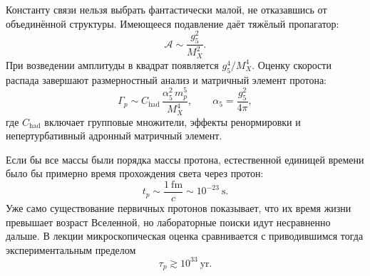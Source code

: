 \begin{classroomqa}
\end{classroomqa}

Константу связи нельзя выбрать фантастически малой, не отказавшись от объединённой структуры. Имеющееся подавление даёт тяжёлый пропагатор:
\begin{equation}
\mathcal A
\sim
\frac{g_5^2}{M_X^2}.
\label{eq:l10-amplitude}
\end{equation}
При возведении амплитуды в квадрат появляется \(g_5^4/M_X^4\). Оценку скорости распада завершают размерностный анализ и матричный элемент протона:
\begin{equation}
\Gamma_p
\sim
C_{\mathrm{had}}\,
\frac{\alpha_5^2\,m_p^5}{M_X^4},
\qquad
\alpha_5=\frac{g_5^2}{4\pi},
\label{eq:l10-rate}
\end{equation}
где \(C_{\mathrm{had}}\) включает групповые множители, эффекты ренормировки и непертурбативный адронный матричный элемент.


\begin{classroomqa}
\end{classroomqa}

Если бы все массы были порядка массы протона, естественной единицей времени было бы примерно время прохождения света через протон:
\begin{equation}
t_p\sim\frac{1\ \mathrm{fm}}{c}\sim10^{-23}\ \mathrm{s}.
\label{eq:l10-proton-time}
\end{equation}
Уже само существование первичных протонов показывает, что их время жизни превышает возраст Вселенной, но лабораторные поиски идут несравненно дальше. В лекции микроскопическая оценка сравнивается с приводившимся тогда экспериментальным пределом
\begin{equation}
\tau_p\gtrsim10^{33}\ \mathrm{yr}.
\label{eq:l10-lifetime-bound}
\end{equation}

